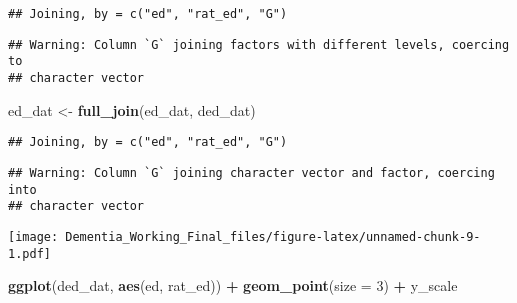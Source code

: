 \documentclass[]{article}
\newenvironment{Shaded}{\begin{snugshade}}{\end{snugshade}}
\newcommand{\DataTypeTok}[1]{\textcolor[rgb]{0.13,0.29,0.53}{#1}}
\newcommand{\DecValTok}[1]{\textcolor[rgb]{0.00,0.00,0.81}{#1}}
\newcommand{\KeywordTok}[1]{\textcolor[rgb]{0.13,0.29,0.53}{\textbf{#1}}}
\newcommand{\NormalTok}[1]{#1}
\newcommand{\OperatorTok}[1]{\textcolor[rgb]{0.81,0.36,0.00}{\textbf{#1}}}
\newcommand{\StringTok}[1]{\textcolor[rgb]{0.31,0.60,0.02}{#1}}
\begin{document}
\begin{verbatim}
## Joining, by = c("ed", "rat_ed", "G")
\end{verbatim}

\begin{verbatim}
## Warning: Column `G` joining factors with different levels, coercing to
## character vector
\end{verbatim}

\begin{Shaded}
\begin{Highlighting}[]
\NormalTok{ed_dat <-}\StringTok{ }\KeywordTok{full_join}\NormalTok{(ed_dat, ded_dat)}
\end{Highlighting}
\end{Shaded}

\begin{verbatim}
## Joining, by = c("ed", "rat_ed", "G")
\end{verbatim}

\begin{verbatim}
## Warning: Column `G` joining character vector and factor, coercing into
## character vector
\end{verbatim}

\begin{Shaded}
\end{Shaded}

\texttt{[image: Dementia\_Working\_Final\_files/figure-latex/unnamed-chunk-9-1.pdf]}

\begin{Shaded}
\begin{Highlighting}[]
\KeywordTok{ggplot}\NormalTok{(ded_dat, }\KeywordTok{aes}\NormalTok{(ed, rat_ed)) }\OperatorTok{+}\StringTok{ }
\StringTok{  }\KeywordTok{geom_point}\NormalTok{(}\DataTypeTok{size =} \DecValTok{3}\NormalTok{) }\OperatorTok{+}\StringTok{ }\NormalTok{y_scale}
\end{Highlighting}
\end{Shaded}
\end{document}
